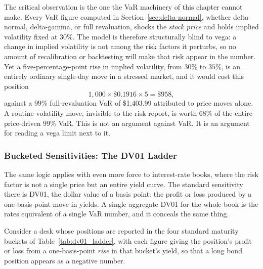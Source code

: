 \documentclass[../ai_in_finance]{subfiles}
\begin{document}
The critical observation is the one the VaR machinery of this chapter cannot make. Every VaR figure computed in Section~\ref{sec:delta-normal}, whether delta-normal, delta-gamma, or full revaluation, shocks the \emph{stock price} and holds implied volatility fixed at $30\%$. The model is therefore structurally blind to vega: a change in implied volatility is not among the risk factors it perturbs, so no amount of recalibration or backtesting will make that risk appear in the number. Yet a five-percentage-point rise in implied volatility, from $30\%$ to $35\%$, is an entirely ordinary single-day move in a stressed market, and it would cost this position
\begin{equation*}
1{,}000 \times \$0.1916 \times 5 = \$958,
\end{equation*}
against a $99\%$ full-revaluation VaR of \$1,403.99 attributed to price moves alone. A routine volatility move, invisible to the risk report, is worth $68\%$ of the entire price-driven $99\%$ VaR. This is not an argument against VaR. It is an argument for reading a vega limit next to it.

\subsubsection*{Bucketed Sensitivities: The DV01 Ladder}

The same logic applies with even more force to interest-rate books, where the risk factor is not a single price but an entire yield curve. The standard sensitivity there is DV01, the dollar value of a basis point: the profit or loss produced by a one-basis-point move in yields. A single aggregate DV01 for the whole book is the rates equivalent of a single VaR number, and it conceals the same thing.

Consider a desk whose positions are reported in the four standard maturity buckets of Table~\ref{tab:dv01_ladder}, with each figure giving the position's profit or loss from a one-basis-point \emph{rise} in that bucket's yield, so that a long bond position appears as a negative number.
\end{document}
